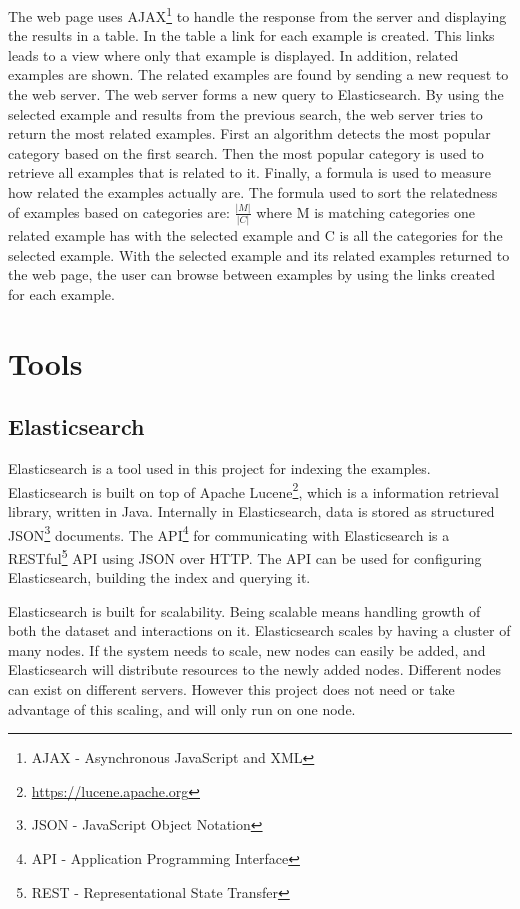 The web page uses AJAX\footnote{AJAX - Asynchronous JavaScript and XML} to handle the response from the server and displaying the results in a table. In the table a link for each example is created. This links leads to a view where only that example is displayed. In addition, related examples are shown. The related examples are found by sending a new request to the web server. The web server forms a new query to Elasticsearch. By using the selected example and results from the previous search, the web server tries to return the most related examples. First an algorithm detects the most popular category based on the first search. Then the most popular category is used to retrieve all examples that is related to it. Finally, a formula is used to measure how related the examples actually are. The formula used to sort the relatedness of examples based on categories are: \(\frac{|M|}{|C|}\) where M is matching categories one related example has with the selected example and C is all the categories for the selected example.
With the selected example and its related examples returned to the web page, the user can browse between examples by using the links created for each example.

\section{Tools}

\subsection{Elasticsearch} \label{elasticsearch}

Elasticsearch is a tool used in this project for indexing the examples. Elasticsearch is built on top of Apache Lucene\footnote{\url{https://lucene.apache.org}}, which is a information retrieval library, written in Java. Internally in Elasticsearch, data is stored as structured JSON\footnote{JSON - JavaScript Object Notation} documents. The API\footnote{API - Application Programming Interface} for communicating with Elasticsearch is a RESTful\footnote{REST - Representational State Transfer} API using JSON over HTTP. The API can be used for configuring Elasticsearch, building the index and querying it. 

Elasticsearch is built for scalability. Being scalable means handling growth of both  the dataset and interactions on it. Elasticsearch scales by having a cluster of many nodes. If the system needs to scale, new nodes can easily be added, and Elasticsearch will distribute resources to the newly added nodes. Different nodes can exist on different servers. However this project does not need or take advantage of this scaling, and will only run on one node.

